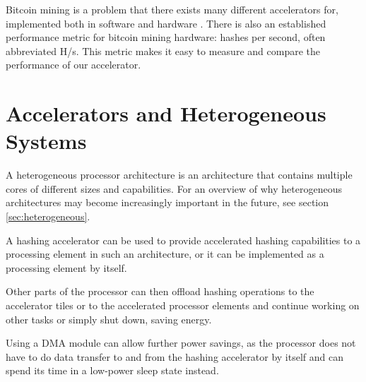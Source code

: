 Bitcoin mining is a problem that there exists many different accelerators
for, implemented both in software and hardware \cite{bespoke-silicon}.
There is also an established performance metric for bitcoin mining hardware:
hashes per second, often abbreviated H/s. This metric makes it easy
to measure and compare the performance of our accelerator.

\section{Accelerators and Heterogeneous Systems}

A heterogeneous processor architecture is an architecture that contains multiple
cores of different sizes and capabilities. For an overview of why heterogeneous
architectures may become increasingly important in the future, see section
\ref{sec:heterogeneous}.

A hashing accelerator can be used to provide accelerated hashing capabilities
to a processing element in such an architecture, or it can be implemented as
a processing element by itself.

Other parts of the processor can then offload hashing operations to the
accelerator tiles or to the accelerated processor elements and continue
working on other tasks or simply shut down, saving energy.

Using a DMA module can allow further
power savings, as the processor does not have to do data transfer to
and from the hashing accelerator by itself and can spend its time
in a low-power sleep state instead.

